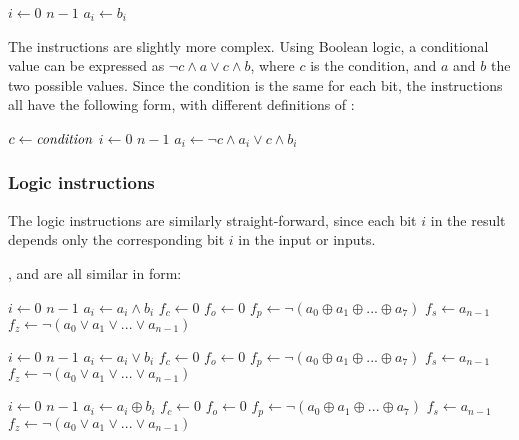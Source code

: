 \documentclass[a4paper,11pt]{kth-mag}
\renewcommand{\gets}{\leftarrow}
\newcommand{\AND}{\land}
\newcommand{\IOR}{\lor}
\newcommand{\XOR}{\oplus}
\newcommand{\NOT}{\lnot}
\begin{document}
\begin{codebox}
\zi \For $i \gets 0$ \To $n-1$
\zi \Do
      $a_i \gets b_i$
    \End
\end{codebox}

The  instructions are slightly more complex.
Using Boolean logic, a conditional value can be expressed as $\NOT c \AND a \IOR c \AND b$, where $c$ is the condition, and $a$ and $b$ the two possible values.
Since the condition is the same for each bit, the  instructions all have the following form, with different definitions of :

\begin{codebox}
\zi $c \gets \id{condition}$
\zi \For $i \gets 0$ \To $n-1$
\zi \Do
      $a_i \gets \NOT c \AND a_i \IOR c \AND b_i$
    \End
\end{codebox}

\subsubsection{Logic instructions}

The logic instructions are similarly straight-forward, since each bit $i$ in the result depends only the corresponding bit $i$ in the input or inputs.

,  and  are all similar in form:

\begin{codebox}
\zi \For $i \gets 0$ \To $n-1$ \Do
\zi   $a_i \gets a_i \AND b_i$ \End
\zi $f_c \gets 0$
\zi $f_o \gets 0$
\zi $f_p \gets \NOT(a_0 \XOR a_1 \XOR ... \XOR a_7)$
\zi $f_s \gets a_{n-1}$
\zi $f_z \gets \NOT(a_0 \IOR a_1 \IOR ... \IOR a_{n-1})$
\end{codebox}

\begin{codebox}
\zi \For $i \gets 0$ \To $n-1$ \Do
\zi   $a_i \gets a_i \IOR b_i$ \End
\zi $f_c \gets 0$
\zi $f_o \gets 0$
\zi $f_p \gets \NOT(a_0 \XOR a_1 \XOR ... \XOR a_7)$
\zi $f_s \gets a_{n-1}$
\zi $f_z \gets \NOT(a_0 \IOR a_1 \IOR ... \IOR a_{n-1})$
\end{codebox}

\begin{codebox}
\zi \For $i \gets 0$ \To $n-1$ \Do
\zi   $a_i \gets a_i \XOR b_i$ \End
\zi $f_c \gets 0$
\zi $f_o \gets 0$
\zi $f_p \gets \NOT(a_0 \XOR a_1 \XOR ... \XOR a_7)$
\zi $f_s \gets a_{n-1}$
\zi $f_z \gets \NOT(a_0 \IOR a_1 \IOR ... \IOR a_{n-1})$
\end{codebox}
\end{document}
